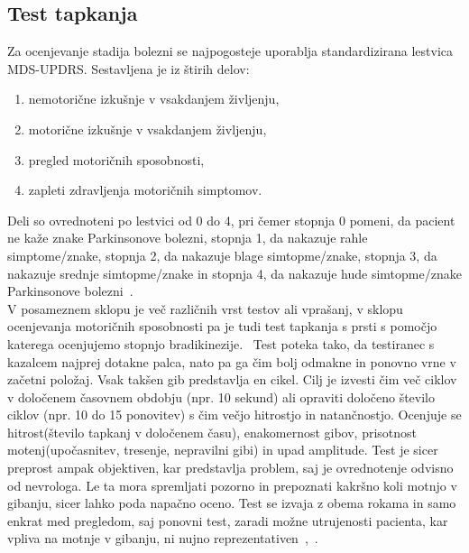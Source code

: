 \documentclass[a4paper,12pt]{article}  %
\begin{document}
\subsection{Test tapkanja}

Za ocenjevanje stadija bolezni se najpogosteje uporablja standardizirana lestvica MDS-UPDRS. Sestavljena je 
iz štirih delov:

\begin{enumerate}
    \item nemotorične izkušnje v vsakdanjem življenju,
    \item motorične izkušnje v vsakdanjem življenju,
    \item pregled motoričnih sposobnosti,
    \item zapleti zdravljenja motoričnih simptomov.
\end{enumerate}

Deli so ovrednoteni po lestvici od 0 do 4, pri čemer stopnja 0 pomeni, da pacient ne kaže znake Parkinsonove 
bolezni, stopnja 1, da nakazuje rahle simptome/znake, stopnja 2, da nakazuje blage simtopme/znake, 
stopnja 3, da nakazuje srednje simtopme/znake in stopnja 4, da nakazuje hude simtopme/znake Parkinsonove 
bolezni~\cite{Goetz}.\\

V posameznem sklopu je več različnih vrst testov ali vprašanj, v sklopu ocenjevanja motoričnih sposobnosti pa je 
tudi test tapkanja s prsti s pomočjo katerega ocenjujemo stopnjo bradikinezije. \
Test poteka tako, da testiranec s kazalcem najprej dotakne palca, nato pa ga čim bolj odmakne in ponovno vrne 
v začetni položaj. Vsak takšen gib predstavlja en cikel. Cilj je izvesti čim več ciklov v določenem časovnem 
obdobju (npr. 10 sekund) ali opraviti določeno število ciklov (npr. 10 do 15 ponovitev) s čim večjo hitrostjo in 
natančnostjo. Ocenjuje se hitrost(število tapkanj v določenem času), enakomernost gibov, prisotnost 
motenj(upočasnitev, tresenje, nepravilni gibi) in upad amplitude. Test je sicer preprost ampak objektiven, 
kar predstavlja problem, saj je ovrednotenje odvisno od nevrologa. Le ta mora spremljati pozorno in 
prepoznati kakršno koli motnjo v gibanju, sicer lahko poda napačno oceno. Test se izvaja z obema rokama in 
samo enkrat med pregledom, saj ponovni test, zaradi možne utrujenosti pacienta, kar vpliva na motnje v 
gibanju, ni nujno reprezentativen~\cite{Goetz},~\cite{Khana}. 
\end{document}
